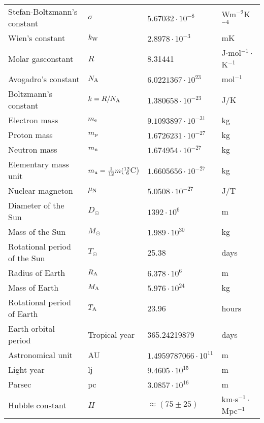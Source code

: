 \begin{center}
\begin{tabular}{||l|lll||}
\hline
Stefan-Boltzmann's constant  &$\sigma$&$5.67032\cdot10^{-8}$&Wm$^{-2}$K$^{-4}$\rule{0pt}{13pt}\\
Wien's constant              &$k_{\rm W}$&$2.8978\cdot10^{-3}$&mK\\
\hline
Molar gasconstant            &$R$&8.31441&J$\cdot$mol$^{-1}\cdot$K$^{-1}$\\
Avogadro's constant          &$N_{\rm A}$&$6.0221367\cdot10^{23}$&mol$^{-1}$\\
Boltzmann's constant         &$k=R/N_{\rm A}$&$1.380658\cdot10^{-23}$&J/K\\
\hline
Electron mass                &$m_{\rm e}$&$9.1093897\cdot10^{-31}$&kg\rule{0pt}{13pt}\\
Proton mass                  &$m_{\rm p}$&$1.6726231\cdot10^{-27}$&kg\\
Neutron mass                 &$m_{\rm n}$&$1.674954\cdot10^{-27}$&kg\\
Elementary mass unit         &$m_{\rm u}=\frac{1}{12}m(^{12}_{~6}$C)&$1.6605656\cdot10^{-27}$&kg\\
Nuclear magneton             &$\mu_{\rm N}$&$5.0508\cdot10^{-27}$&J/T\\
\hline
Diameter of the Sun          &$D_\odot$&$1392\cdot10^6$&m\rule{0pt}{13pt}\\
Mass of the Sun              &$M_\odot$&$1.989\cdot10^{30}$&kg\\
Rotational period of the Sun &$T_\odot$&25.38&days\\
Radius of Earth              &$R_{\rm A}$&$6.378\cdot10^6$&m\\
Mass of Earth                &$M_{\rm A}$&$5.976\cdot10^{24}$&kg\\
Rotational period of Earth   &$T_{\rm A}$&23.96&hours\\
Earth orbital period         &Tropical year&365.24219879&days\\
Astronomical unit            &AU&$1.4959787066\cdot10^{11}$&m\\
Light year                   &lj&$9.4605\cdot10^{15}$&m\\
Parsec                       &pc&$3.0857\cdot10^{16}$&m\\
Hubble constant              &$H$&$\approx(75\pm25)$&km$\cdot$s$^{-1}\cdot$Mpc$^{-1}$\\
\hline
\end{tabular}
\end{center}

\renewcommand{\chaptermark}[1]{\markboth{#1}{#1}}

